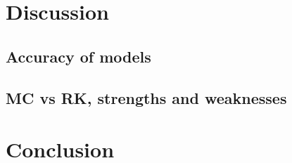 \section{Discussion}

\subsection{Accuracy of models}

\subsection{MC vs RK, strengths and weaknesses}

\section{Conclusion}